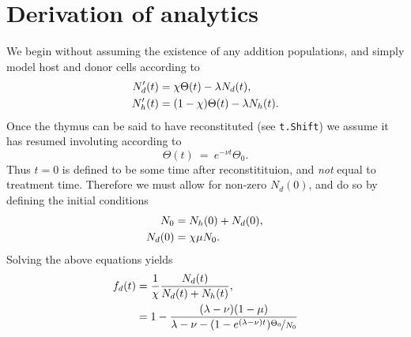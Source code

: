 \documentclass{tufte-book} %
\begin{document}
\section{Derivation of analytics}
We begin without assuming the existence of any addition populations, and simply model host and donor cells according to
\begin{align}
N'_d(t)&=\chi \Theta(t)-\lambda N_d (t)\notag{} , \\
N'_h(t)&=(1-\chi)\Theta(t)-\lambda N_h(t).
\end{align}
Once the thymus can be said to have reconstituted (see \texttt{t.Shift}) we assume it has resumed involuting according to
\begin{equation}
 \Theta(t)~=~e^{-\nu t}\Theta_0.
 \end{equation}
Thus $t=0$ is defined to be some time after reconstitituion, and \textit{not} equal to treatment time. Therefore
 we must allow for non-zero $N_d(0)$, and do so by defining the initial conditions
\begin{align}
 N_0 &= N_h(0)+N_d(0),\notag{} \\
N_d(0) &= \chi \mu N_0.
 \end{align}
Solving the above equations yields
\begin{align}
f_d(t)&=\frac{1}{\chi}\frac{N_d(t)}{N_d(t)+N_h(t)},\notag{}\\
& = 1-\frac{(\lambda-\nu)(1-\mu)}{\lambda-\nu-(1-e^{(\lambda-\nu)t})\nicefrac{\Theta_0}{N_0}}
\end{align}
\end{document}
